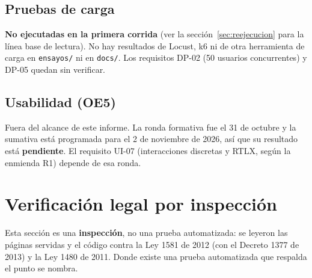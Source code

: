 \documentclass[11pt,letterpaper]{article}
\newcommand{\ruta}[1]{\texttt{\small #1}}
\begin{document}
\subsection{Pruebas de carga}

\textbf{No ejecutadas en la primera corrida} (ver la sección~\ref{sec:reejecucion} para la línea base de lectura). No hay resultados de Locust, k6 ni de otra herramienta de carga en \ruta{ensayos/} ni
en \ruta{docs/}. Los requisitos DP-02 (50 usuarios concurrentes) y DP-05 quedan sin verificar.

\subsection{Usabilidad (OE5)}

Fuera del alcance de este informe. La ronda formativa fue el 31 de octubre y la sumativa está programada para
el 2 de noviembre de 2026, así que su resultado está \textbf{pendiente}. El requisito UI-07 (interacciones
discretas y RTLX, según la enmienda R1) depende de esa ronda.

\section{Verificación legal por inspección}

Esta sección es una \textbf{inspección}, no una prueba automatizada: se leyeron las páginas servidas y el
código contra la Ley 1581 de 2012 (con el Decreto 1377 de 2013) y la Ley 1480 de 2011. Donde existe una prueba
automatizada que respalda el punto se nombra.
\end{document}
